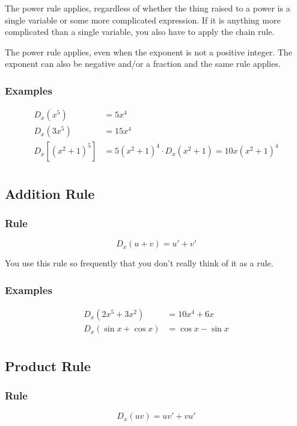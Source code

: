 \documentclass[fleqn]{article}
\begin{document}
The power rule applies, regardless of whether the thing raised to a power is a single variable or some more complicated
expression.  If it is anything more complicated than a single variable, you also have to apply the chain rule.

The power rule applies, even when the exponent is not a positive integer.  The exponent can also be negative and/or a
fraction and the same rule applies.

\subsubsection{Examples}

\begin{align*}
  D_x (x^5) &= 5x^4 \\
  D_x (3 x^5) &= 15x^4 \\
  D_x \left[ (x^2 + 1)^5 \right] &= 5 (x^2 + 1)^4 \cdot D_x (x^2 + 1) = 10x(x^2 + 1)^4 \\
\end{align*}


\subsection{Addition Rule}

\subsubsection{Rule}
\[
  D_x (u + v) = u' + v'
\]

You use this rule so frequently that you don't really think of it as a rule.

\subsubsection{Examples}

\begin{align*}
  D_x (2x^5 + 3x^2) &= 10 x^4 + 6x \\
  D_x (\sin x + \cos x) &=  \cos x - \sin x \\
\end{align*}


\subsection{Product Rule}
\subsubsection{Rule}
\[
  D_x (uv) = uv' + vu'
\]
\end{document}
